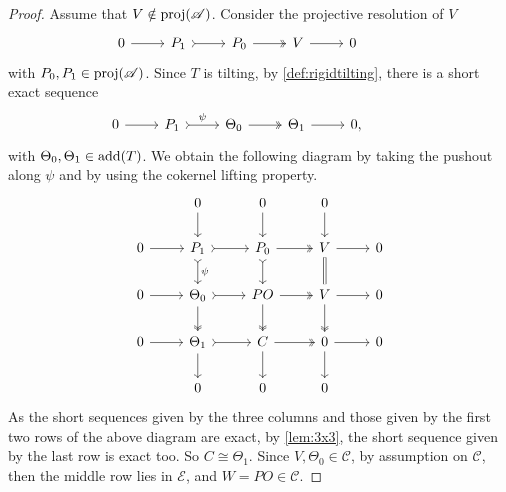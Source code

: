\begin{proof}
Assume that $V \notin \operatorname{proj}(\mathscr{A})$. Consider the projective resolution of $V$
\[\begin{tikzcd}
     0 & P_1 & P_0 & V &  0 & 
	\arrow[from=1-1, to=1-2]
	\arrow[tail, from=1-2, to=1-3]
	\arrow[two heads,from=1-3, to=1-4]
	\arrow[from=1-4, to=1-5]
\end{tikzcd}\] with $P_0,P_1 \in \operatorname{proj}(\mathscr{A})$. Since $T$ is tilting, by \cref{def:rigidtilting}, there is a short exact sequence
\[\begin{tikzcd}
   0 & P_1 & \Theta_0 & \Theta_1 &  0, & 
	\arrow[from=1-1, to=1-2]
	\arrow[tail,"\psi", from=1-2, to=1-3]
	\arrow[two heads,from=1-3, to=1-4]
	\arrow[from=1-4, to=1-5]
\end{tikzcd}\] with $\Theta_0,\Theta_1 \in \operatorname{add}(T)$. 
We obtain the following diagram by taking the pushout along $\psi$ and by using the cokernel lifting property.
\[\begin{tikzcd}
         & 0 & 0 & 0 &  \\
	0 & P_1 & P_0  & V &  0 \\
     0 & \Theta_0 & PO & V & 0 \\
      0 & \Theta_1 & C & 0 & 0 \\
       & 0 & 0 & 0 & 
	\arrow[from=2-1, to=2-2]
	\arrow[tail, from=2-2, to=2-3]
	\arrow[two heads,from=2-3, to=2-4]
	\arrow[from=2-4, to=2-5]
        \arrow[from=3-1, to=3-2]
	\arrow[tail, from=3-2, to=3-3]
	\arrow[two heads,from=3-3, to=3-4]
	\arrow[from=3-4, to=3-5]
        \arrow[from=4-1, to=4-2]
	\arrow[tail, from=4-2, to=4-3]
	\arrow[two heads,from=4-3, to=4-4]
	\arrow[from=4-4, to=4-5]
        \arrow[from=4-2, to=5-2]
	\arrow[two heads, from=3-2, to=4-2]
	\arrow[tail,"\psi",from=2-2, to=3-2]
	\arrow[from=1-2, to=2-2]
        \arrow[from=4-3, to=5-3]
	\arrow[two heads, from=3-3, to=4-3]
	\arrow[tail,from=2-3, to=3-3]
	\arrow[from=1-3, to=2-3]
        \arrow[from=4-4, to=5-4]
	\arrow[two heads, from=3-4, to=4-4]
	\arrow[equals,from=2-4, to=3-4]
	\arrow[from=1-4, to=2-4]
\end{tikzcd} \]
As the short sequences given by the three columns and those given by the first two rows of the above diagram are exact, by \cref{lem:3x3}, the short sequence given by the last row is exact too. So $C \cong \Theta_1$. Since $V,\Theta_0 \in \mathscr{C}$, by assumption on $\mathscr{C}$, then the middle row lies in $\mathcal{E}$, and $W = PO \in \mathscr{C}$.


\end{proof}
